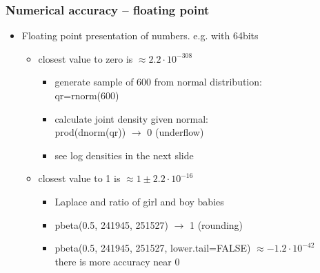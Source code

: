 \documentclass[10pt]{beamer}
\begin{document}
\begin{frame}

\frametitle{Numerical accuracy -- floating point}

  \begin{itemize}
  \item Floating point presentation of numbers. e.g. with 64bits
    \begin{itemize}
    \item closest value to zero is $\approx 2.2\cdot 10^{-308}$
      \begin{itemize}
      \item generate sample of 600 from normal distribution:\\
        {\color{uured} qr=rnorm(600)}
      \item calculate joint density given normal:\\
        {\color{uured} prod(dnorm(qr)) $\rightarrow$} {\color{red} 0 (underflow)}
      \item<2-> see log densities in the next slide
      \end{itemize}
    \item<3-> closest value to 1 is $\approx 1 \pm  2.2\cdot 10^{-16}$
      \begin{itemize}
      \item<3-> Laplace and ratio of girl and boy babies
      \item<3-> {\color{uured}  pbeta(0.5, 241945, 251527) $\rightarrow$} {\color{red}  1 (rounding)}
      \item<4-> {\color{uured} pbeta(0.5, 241945, 251527, lower.tail=FALSE) $\approx -1.2\cdot 10^{-42}$}\\
        there is more accuracy near 0
      \end{itemize}
    \end{itemize}
  \end{itemize}

\end{frame}
\end{document}
